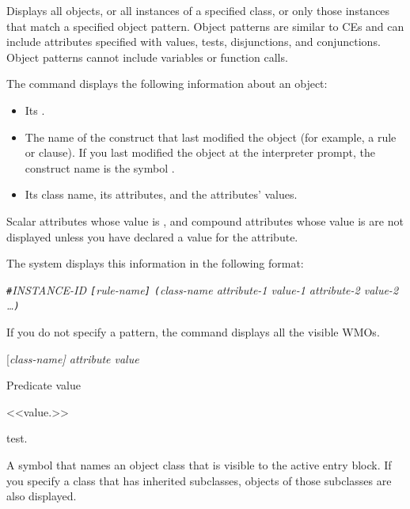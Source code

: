 {{Displays all objects, or all instances of a specified class, or only
those instances that match a specified object pattern. Object patterns
are similar to CEs and can include attributes specified with values,
tests, disjunctions, and conjunctions. Object patterns cannot include
variables or function calls.

The  command displays the following information about an
object:
\begin{itemize}
\item Its .

\item The name of the construct that last modified the object (for
  example, a rule or  clause). If you last modified the object at
  the interpreter prompt, the construct name is the symbol .

\item Its class name, its attributes, and the attributes' values.
\end{itemize}

Scalar attributes whose value is , and compound attributes
whose value is  are not displayed unless you have
declared a  value for the attribute.

The system displays this information in the following format:

\begin{center}
  \verb|#|\it{INSTANCE-ID} \verb|[|\it{rule-name}\verb|]|
  \verb|(|\it{class-name} \it{attribute-1} \it{value-1}
  \it{attribute-2} \it{value-2} \ldots\verb|)|
\end{center}

If you do not specify a pattern, the command displays all the visible
WMOs.

\Format

 [\it{class-name}] \ct\it{attribute} \it{value}

Predicate value

<<value.>>

{test.}

\begin{arguments}
\item[class-name]

  A symbol that names an object class that is visible to the active
  entry block. If you specify a class that has inherited subclasses,
  objects of those subclasses are also displayed.

\item[attribute]


\end{arguments}}}
